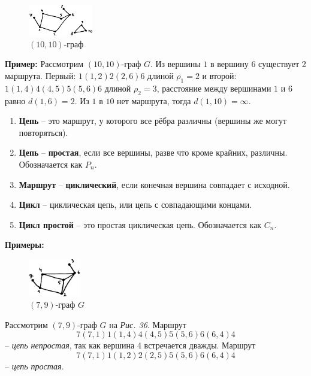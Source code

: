 \documentclass[12pt, a4paper]{article}
\begin{document}
\begin{figure}
  \vspace{-8mm}
  \centering
  \includegraphics[width=0.25\textwidth]{36}
  \vspace{-7mm}
  \caption{$(10,10)$-граф}
\end{figure}

\textbf{Пример:} Рассмотрим $(10, 10)$-граф $G$. Из вершины $1$ в вершину $6$ существует 2 маршрута. Первый: $1(1, 2)2(2, 6)6$ длиной $\rho_1=2$ и второй: $1(1, 4)4(4, 5)5(5, 6)6$ длиной $\rho_2=3$, расстояние между вершинами $1$ и $6$ равно $d(1, 6) = 2$. Из $1$ в $10$ нет маршрута, тогда $d(1, 10) = \infty$.

\begin{enumerate}
 \item \textbf{Цепь} -- это маршрут, у которого все рёбра различны (вершины же могут повторяться).
 \item \textbf{Цепь} -- \textbf{простая}, если все вершины, разве что кроме крайних, различны. Обозначается как $P_n$.
 \item \textbf{Маршрут} -- \textbf{циклический}, если конечная вершина совпадает с исходной.
 \item \textbf{Цикл} -- циклическая цепь, или цепь с совпадающими концами.
 \item \textbf{Цикл простой} -- это простая циклическая цепь. Обозначается как $C_n$.
\end{enumerate}

\textbf{Примеры:}

\begin{figure}
 \centering
 \vspace{-10mm}
 \includegraphics[width=0.2\textwidth]{37}
 \vspace{-4mm}
 \caption{$(7,9)$-граф $G$}
\end{figure}

Рассмотрим $(7,9)$-граф $G$ на \textit{Рис. 36}. Маршрут
\[7(7,1)1(1,4)4(4,5)5(5,6)6(6,4)4 \]
-- \textit{цепь непростая}, так как вершина 4 встречается дважды. Маршрут
\[7(7,1)1(1,2)2(2,5)5(5,6)6(6,4)4 \]
-- \textit{цепь простая}.
\end{document}
